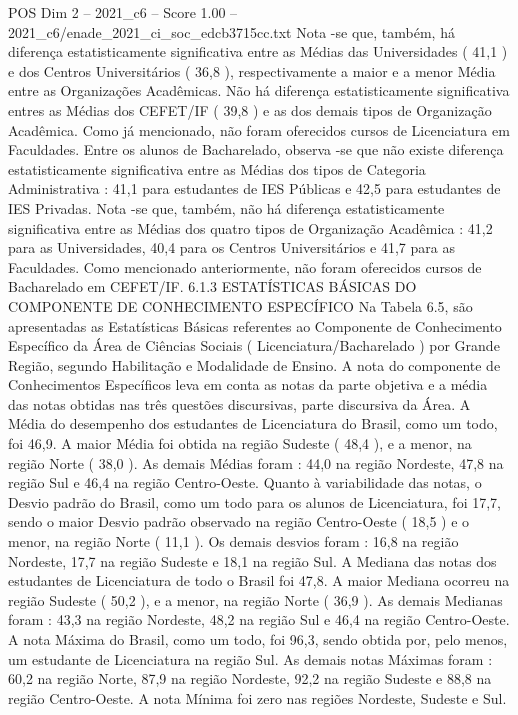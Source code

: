 \begin{textsample}{POS Dim 2 – 2021\_c6 – Score 1.00 – 2021\_c6/enade\_2021\_ci\_soc\_edcb3715cc.txt}
Nota -se que, também, há diferença estatisticamente significativa entre as Médias das Universidades ( 41,1 ) e dos Centros Universitários ( 36,8 ), respectivamente a maior e a menor Média entre as Organizações Acadêmicas.
Não há diferença estatisticamente significativa entres as Médias dos CEFET/IF ( 39,8 ) e as dos demais tipos de Organização Acadêmica.
Como já mencionado, não foram oferecidos cursos de Licenciatura em Faculdades.
Entre os alunos de Bacharelado, observa -se que não existe diferença estatisticamente significativa entre as Médias dos tipos de Categoria Administrativa : 41,1 para estudantes de IES Públicas e 42,5 para estudantes de IES Privadas.
Nota -se que, também, não há diferença estatisticamente significativa entre as Médias dos quatro tipos de Organização Acadêmica : 41,2 para as Universidades, 40,4 para os Centros Universitários e 41,7 para as Faculdades.
Como mencionado anteriormente, não foram oferecidos cursos de Bacharelado em CEFET/IF. 6.1.3 ESTATÍSTICAS BÁSICAS DO COMPONENTE DE CONHECIMENTO ESPECÍFICO Na Tabela 6.5, são apresentadas as Estatísticas Básicas referentes ao Componente de Conhecimento Específico da Área de Ciências Sociais ( Licenciatura/Bacharelado ) por Grande Região, segundo Habilitação e Modalidade de Ensino.
A nota do componente de Conhecimentos Específicos leva em conta as notas da parte objetiva e a média das notas obtidas nas três questões discursivas, parte discursiva da Área.
A Média do desempenho dos estudantes de Licenciatura do Brasil, como um todo, foi 46,9.
A maior Média foi obtida na região Sudeste ( 48,4 ), e a menor, na região Norte ( 38,0 ).
As demais Médias foram : 44,0 na região Nordeste, 47,8 na região Sul e 46,4 na região Centro-Oeste.
Quanto à variabilidade das notas, o Desvio padrão do Brasil, como um todo para os alunos de Licenciatura, foi 17,7, sendo o maior Desvio padrão observado na região Centro-Oeste ( 18,5 ) e o menor, na região Norte ( 11,1 ).
Os demais desvios foram : 16,8 na região Nordeste, 17,7 na região Sudeste e 18,1 na região Sul.
A Mediana das notas dos estudantes de Licenciatura de todo o Brasil foi 47,8.
A maior Mediana ocorreu na região Sudeste ( 50,2 ), e a menor, na região Norte ( 36,9 ).
As demais Medianas foram : 43,3 na região Nordeste, 48,2 na região Sul e 46,4 na região Centro-Oeste.
A nota Máxima do Brasil, como um todo, foi 96,3, sendo obtida por, pelo menos, um estudante de Licenciatura na região Sul.
As demais notas Máximas foram : 60,2 na região Norte, 87,9 na região Nordeste, 92,2 na região Sudeste e 88,8 na região Centro-Oeste.
A nota Mínima foi zero nas regiões Nordeste, Sudeste e Sul.

\end{textsample}
